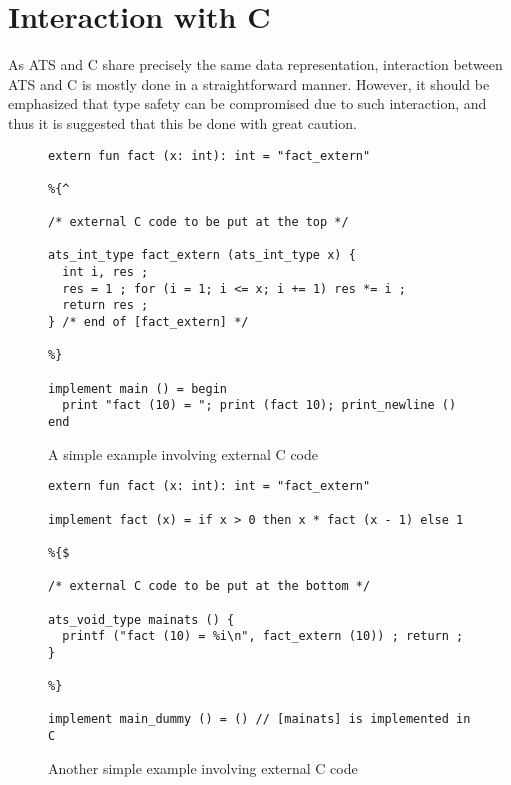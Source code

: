 \chapter{Interaction with C}\label{chapter:interaction_with_c} As ATS and C
share precisely the same data representation, interaction between ATS and C
is mostly done in a straightforward manner.  However, it should be
emphasized that type safety can be compromised due to such interaction,
and thus it is suggested that this be done with great caution.

\begin{figure}[thp]
\begin{verbatim}
extern fun fact (x: int): int = "fact_extern"

%{^

/* external C code to be put at the top */

ats_int_type fact_extern (ats_int_type x) {
  int i, res ;
  res = 1 ; for (i = 1; i <= x; i += 1) res *= i ;  
  return res ;
} /* end of [fact_extern] */

%}

implement main () = begin
  print "fact (10) = "; print (fact 10); print_newline ()
end
\end{verbatim}
\caption{A simple example involving external C code}
\label{figure:fact_extern_function_1}
\end{figure}

\begin{figure}[thp]
\begin{verbatim}
extern fun fact (x: int): int = "fact_extern"

implement fact (x) = if x > 0 then x * fact (x - 1) else 1

%{$

/* external C code to be put at the bottom */

ats_void_type mainats () {
  printf ("fact (10) = %i\n", fact_extern (10)) ; return ;
}

%}

implement main_dummy () = () // [mainats] is implemented in C
\end{verbatim}
\caption{Another simple example involving external C code}
\label{figure:fact_extern_function_2}
\end{figure}
